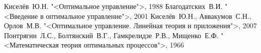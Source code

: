 \begin{thebibliography}{1}
        Киселёв~Ю.Н.
        "<Оптимальное управление">,
        1988
        Благодатских~В.И. 
        "<Введение в оптимальное управление">,
        2001
        Киселёв~Ю.Н., Аввакумов~С.Н., Орлов~М.В. 
        "<Оптимальное управление. Линейная теория и приложения">, 
        2007
        Понтрягин~Л.С., Болтянский~В.Г., Гамкрелидзе~Р.В., Мищенко~Е.Ф. 
        "<Математическая теория оптимальных процессов">, 
        1966
\end{thebibliography}
